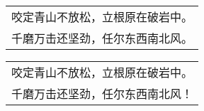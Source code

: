 \nopagebreak%
\nopagebreak%
\noindent\begin{minipage}{\linewidth}
  \vskip-3pt\begin{table}[H]
    \centering
    \begin{tabular}{@{}l@{}}
咬定青山不放松，立根原在破岩中。\\
千磨万击还坚劲，任尔东西南北风。
    \end{tabular}
  \end{table}
\end{minipage}
\vspace{1cm}


\nopagebreak%
\nopagebreak%
\noindent\begin{minipage}{\linewidth}
  \vskip-3pt\begin{table}[H]
    \centering
    \begin{tabular}{@{}l@{}}
咬定青山不放松，立根原在破岩中。\\
千磨万击还坚劲，任尔东西南北风！
    \end{tabular}
  \end{table}
\end{minipage}
\vspace{1cm}


